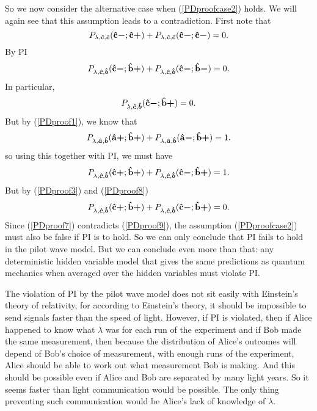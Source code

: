 So we now consider the alternative case when (\ref{PDproofcase2}) holds. We will again see that this assumption leads to a contradiction. First note that
\begin{equation}
 P_{\lambda,\bm{\hat{c}},\bm{\hat{c}}}(\vb{\hat{{c}}}\bm{-};\vb{\hat{{c}}}\bm{+})+P_{\lambda,\bm{\hat{c}},\bm{\hat{c}}}(\vb{\hat{{c}}}\bm{-};\vb{\hat{{c}}}\bm{-})=0.
\end{equation}
 By PI
\begin{equation}
P_{\lambda,\bm{\hat{c}},\bm{\hat{b}}}(\vb{\hat{{c}}}\bm{-};\vb{\hat{{b}}}\bm{+})+P_{\lambda,\bm{\hat{c}},\bm{\hat{b}}}(\vb{\hat{{c}}}\bm{-};\vb{\hat{{b}}}\bm{-})=0.
\end{equation}
In particular, 
\begin{equation}\label{PDproof8}
P_{\lambda,\bm{\hat{c}},\bm{\hat{b}}}(\vb{\hat{{c}}}\bm{-};\vb{\hat{{b}}}\bm{+})=0.
\end{equation}
   But by (\ref{PDproof1}), we know that 
  \begin{equation}
  P_{\lambda,\bm{\hat{a}},\bm{\hat{b}}}(\vb{\hat{{a}}}\bm{+};\vb{\hat{{b}}}\bm{+})+P_{\lambda,\bm{\hat{a}},\bm{\hat{b}}}(\vb{\hat{{a}}}\bm{-};\vb{\hat{{b}}}\bm{+})=1.
  \end{equation}   
 so using this together with PI, we must have
    \begin{equation}\label{PDproof7}
  P_{\lambda,\bm{\hat{c}},\bm{\hat{b}}}(\vb{\hat{{c}}}\bm{+};\vb{\hat{{b}}}\bm{+})+P_{\lambda,\bm{\hat{c}},\bm{\hat{b}}}(\vb{\hat{{c}}}\bm{-};\vb{\hat{{b}}}\bm{+})=1.
  \end{equation} 
   But by (\ref{PDproof3}) and (\ref{PDproof8})
\begin{equation}\label{PDproof9}
 P_{\lambda,\bm{\hat{c}},\bm{\hat{b}}}(\vb{\hat{{c}}}\bm{+};\vb{\hat{{b}}}\bm{+})+P_{\lambda,\bm{\hat{c}},\bm{\hat{b}}}(\vb{\hat{{c}}}\bm{-};\vb{\hat{{b}}}\bm{+})=0.
\end{equation}
Since (\ref{PDproof7}) contradicts (\ref{PDproof9}), the assumption (\ref{PDproofcase2}) must also be false if PI is to hold. So we can only conclude that PI fails to hold in the pilot wave model.   But we can conclude even more than that: any deterministic hidden variable model that gives the same predictions as quantum mechanics when averaged over the hidden variables must violate PI. 

The violation of PI by the pilot wave model does not sit easily with Einstein's theory of relativity, for according to Einstein's theory, it should be impossible to send signals faster than the speed of light. However, if PI is violated, then if Alice happened to know what $\lambda$ was for each run of the experiment and if Bob made the same measurement, then because the distribution of Alice's outcomes will depend of Bob's choice of measurement, with enough runs of the experiment, Alice should be able to work out what measurement Bob is making. And this should be possible even if Alice and Bob are separated by many light years. So it seems faster than light communication would be possible. The only thing preventing such communication would be Alice's lack of knowledge of $\lambda$. 

